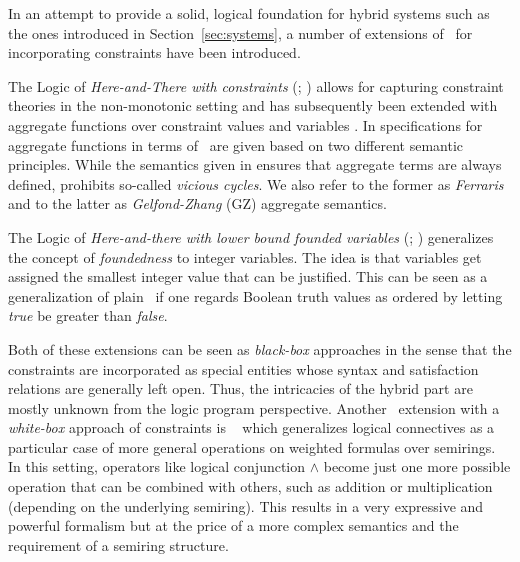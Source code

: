 In an attempt to provide a solid, logical foundation for hybrid systems such as the ones introduced in Section~\ref{sec:systems},
a number of extensions of \HT\ for incorporating constraints have been introduced.

The Logic of \emph{Here-and-There with constraints} (\HTC; \cite{cakaossc16a}) allows for capturing constraint theories in the non-monotonic setting
and has subsequently been extended with aggregate functions over constraint values and variables \cite{cafascwa20a,cafascwa20b}.
%
In \cite{cafascwa20b} specifications for aggregate functions in terms of \HTC\ are given based on two different semantic principles.
%
While the semantics given in \cite{ferraris11a} ensures that aggregate terms are always defined,
\cite{gelzha14a} prohibits so-called \emph{vicious cycles}. %
%
We also refer to the former as \emph{Ferraris} and to the latter as \emph{Gelfond-Zhang} (GZ) aggregate semantics.

The Logic of \emph{Here-and-there with lower bound founded variables} (\HTLB; \cite{cafascsc19a}) generalizes the concept of \emph{foundedness} to integer variables.
The idea is that variables get assigned the smallest integer value that can be justified.
This can be seen as a generalization of plain \HT\ if one regards Boolean truth values as ordered by letting \textit{true} be greater than \textit{false}.

Both of these extensions can be seen as \emph{black-box} approaches in the sense that the constraints are incorporated
as special entities whose syntax and satisfaction relations are generally left open.
Thus, the intricacies of the hybrid part are mostly unknown from the logic program perspective.
%
Another \HT\ extension with a \emph{white-box} approach of constraints is \ASPAC\ \cite{eitkie20a}
which generalizes logical connectives as a particular case of more general operations on weighted formulas over semirings.
In this setting, operators like logical conjunction $\wedge$ become just one more possible operation that can be combined with others,
such as addition or multiplication (depending on the underlying semiring).
%
This results in a very expressive and powerful formalism but at the price of a more complex semantics and the requirement of a semiring structure.

